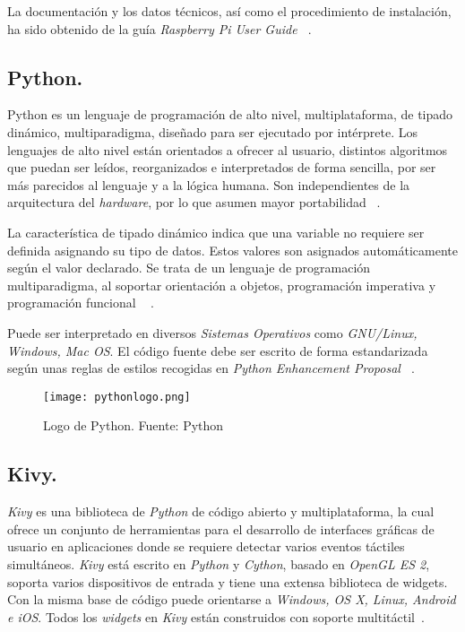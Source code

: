 La documentación y los datos técnicos, así como el procedimiento de instalación, ha sido obtenido de la guía \emph{Raspberry Pi User Guide ~\cite{Upton}}.  

\subsection{Python.}
Python es un lenguaje de programación de alto nivel, multiplataforma, de tipado dinámico, multiparadigma, diseñado para ser ejecutado por intérprete. Los lenguajes de alto nivel están orientados a ofrecer al usuario, distintos algoritmos que puedan ser leídos, reorganizados e interpretados de forma sencilla, por ser más parecidos al lenguaje y a la lógica humana. Son independientes de la arquitectura del \emph{hardware}, por lo que asumen mayor portabilidad ~\cite{Python}.

La característica de tipado dinámico indica que una variable no requiere ser definida asignando su tipo de datos. Estos valores son asignados automáticamente según el valor declarado.
Se trata de un lenguaje de programación multiparadigma, al soportar orientación a objetos, programación imperativa y programación funcional ~\cite{Bahit} .

Puede ser interpretado en diversos \emph{Sistemas Operativos} como \emph{GNU/Linux, Windows, Mac OS}.
El código fuente debe ser escrito de forma estandarizada según unas reglas de estilos recogidas en \emph{Python Enhancement Proposal ~\cite{Proposal}}.

\begin{figure}[!h]
\begin{center}
\texttt{[image: pythonlogo.png]}
\caption{Logo de Python. Fuente: Python~\cite{Python}}
\label{fig:pythonlogo}
\end{center}
\end{figure}


\subsection{Kivy.}
\emph{Kivy} es una biblioteca de \emph{Python} de código abierto y multiplataforma, la cual ofrece un conjunto de herramientas para el desarrollo de interfaces gráficas de usuario en aplicaciones donde se requiere detectar varios eventos táctiles simultáneos.
\emph{Kivy} está escrito en \emph{Python} y \emph{Cython}, basado en \emph{OpenGL ES 2}, soporta varios dispositivos de entrada y tiene una extensa biblioteca de widgets. Con la misma base de código puede orientarse a \emph{Windows, OS X, Linux, Android e iOS}. Todos los \emph{widgets} en \emph{Kivy} están construidos con soporte multitáctil~\cite{Kivy}.

